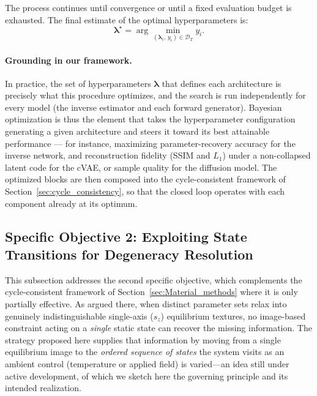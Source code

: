 \documentclass[letterpaper, 12, one column]{article}
\begin{document}
The process continues until convergence or until a fixed evaluation budget is exhausted.
The final estimate of the optimal hyperparameters is:
\begin{equation}
\label{eq:optimal_hyperparameters}
\boldsymbol{\lambda}^{\star}
= \arg\min_{(\boldsymbol{\lambda}_{i},\, y_{i}) \in \mathcal{D}_{T}}
y_{i}.
\end{equation}

\paragraph{Grounding in our framework.}
In practice, the set of hyperparameters $\boldsymbol{\lambda}$ that defines each architecture is precisely what this procedure optimizes, and the search is run independently for every model (the inverse estimator and each forward generator). Bayesian optimization is thus the element that takes the hyperparameter configuration generating a given architecture and steers it toward its best attainable performance --- for instance, maximizing parameter-recovery accuracy for the inverse network, and reconstruction fidelity (SSIM and $L_1$) under a non-collapsed latent code for the cVAE, or sample quality for the diffusion model. The optimized blocks are then composed into the cycle-consistent framework of Section~\ref{sec:cycle_consistency}, so that the closed loop operates with each component already at its optimum.

\subsection{Specific Objective 2: Exploiting State Transitions for Degeneracy Resolution}\label{sec:temporal_objective}

This subsection addresses the second specific objective, which complements the cycle-consistent framework of Section~\ref{sec:Material_methods} where it is only partially effective. As argued there, when distinct parameter sets relax into genuinely indistinguishable single-axis ($s_z$) equilibrium textures, no image-based constraint acting on a \emph{single} static state can recover the missing information. The strategy proposed here supplies that information by moving from a single equilibrium image to the \emph{ordered sequence of states} the system visits as an ambient control (temperature or applied field) is varied---an idea still under active development, of which we sketch here the governing principle and its intended realization.
\end{document}
